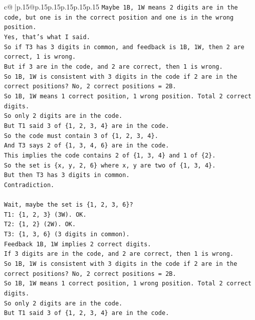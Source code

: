 \documentclass{article}
\begin{document}
{\begin{supertabular}{c@{$\;$}|p{.15\linewidth}@{}p{.15\linewidth}p{.15\linewidth}p{.15\linewidth}p{.15\linewidth}p{.15\linewidth}}
{{{\texttt{Maybe 1B, 1W means 2 digits are in the code, but one is in the correct position and one is in the wrong position.} \\
\texttt{Yes, that's what I said.} \\
\texttt{So if T3 has 3 digits in common, and feedback is 1B, 1W, then 2 are correct, 1 is wrong.} \\
\texttt{But if 3 are in the code, and 2 are correct, then 1 is wrong.} \\
\texttt{So 1B, 1W is consistent with 3 digits in the code if 2 are in the correct positions? No, 2 correct positions = 2B.} \\
\texttt{So 1B, 1W means 1 correct position, 1 wrong position. Total 2 correct digits.} \\
\texttt{So only 2 digits are in the code.} \\
\texttt{But T1 said 3 of \{1, 2, 3, 4\} are in the code.} \\
\texttt{So the code must contain 3 of \{1, 2, 3, 4\}.} \\
\texttt{And T3 says 2 of \{1, 3, 4, 6\} are in the code.} \\
\texttt{This implies the code contains 2 of \{1, 3, 4\} and 1 of \{2\}.} \\
\texttt{So the set is \{x, y, 2, 6\} where x, y are two of \{1, 3, 4\}.} \\
\texttt{But then T3 has 3 digits in common.} \\
\texttt{Contradiction.} \\
\\ 
\texttt{Wait, maybe the set is \{1, 2, 3, 6\}?} \\
\texttt{T1: \{1, 2, 3\} (3W). OK.} \\
\texttt{T2: \{1, 2\} (2W). OK.} \\
\texttt{T3: \{1, 3, 6\} (3 digits in common).} \\
\texttt{Feedback 1B, 1W implies 2 correct digits.} \\
\texttt{If 3 digits are in the code, and 2 are correct, then 1 is wrong.} \\
\texttt{So 1B, 1W is consistent with 3 digits in the code if 2 are in the correct positions? No, 2 correct positions = 2B.} \\
\texttt{So 1B, 1W means 1 correct position, 1 wrong position. Total 2 correct digits.} \\
\texttt{So only 2 digits are in the code.} \\
\texttt{But T1 said 3 of \{1, 2, 3, 4\} are in the code.} \\
}}}
\end{supertabular}}
\end{document}
